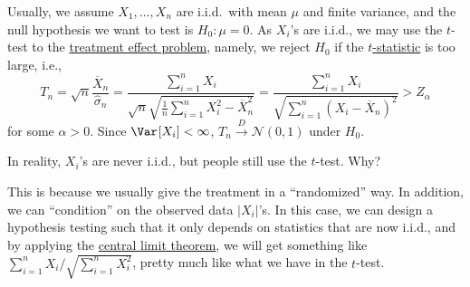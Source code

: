 Usually, we assume \(X_1 , \dots , X_n\) are i.i.d.\ with mean \(\mu \) and finite variance, and the null hypothesis we want to test is \(H_0 \colon \mu = 0\). As \(X_i\)'s are i.i.d., we may use the \(t\)-test to the \hyperref[eg:treatment-effect]{treatment effect problem}, namely, we reject \(H_0\) if the \hyperref[def:t-statistic]{\(t\)-statistic} is too large, i.e.,
\[
	T_n
	= \sqrt{n} \frac{\overline{X} _n}{\hat{\sigma} _n}
	= \frac{\sum_{i=1}^{n} X_i}{\sqrt{n} \sqrt{\frac{1}{n} \sum_{i=1}^{n} X_i^2 - \overline{X} _n^2} }
	= \frac{\sum_{i=1}^{n} X_i}{\sqrt{\sum_{i=1}^{n} (X_i - \overline{X} _n)^2} }
	> Z_{\alpha }
\]
for some \(\alpha > 0\). Since \(\Var_{}[X_i] < \infty \), \(T_n \overset{D}{\to} \mathcal{N} (0, 1)\) under \(H_0\).

\begin{problem*}
	In reality, \(X_i\)'s are never i.i.d., but people still use the \(t\)-test. Why?
\end{problem*}
\begin{answer}
	This is because we usually give the treatment in a ``randomized'' way. In addition, we can ``condition'' on the observed data \(\vert X_i \vert \)'s. In this case, we can design a hypothesis testing such that it only depends on statistics that are now i.i.d., and by applying the \hyperref[thm:CLT]{central limit theorem}, we will get something like \(\sum_{i=1}^{n} X_i / \sqrt{\sum_{i=1}^{n} X_i^2} \), pretty much like what we have in the \(t\)-test.
\end{answer}